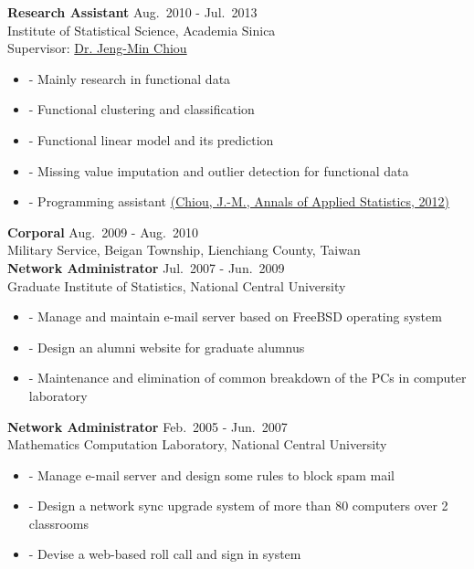\documentclass[a4paper,10pt,dvipdfmx]{article}
\begin{document}
\indent \textbf{Research Assistant} \hfill Aug.~2010 - Jul.~2013\\
\indent Institute of Statistical Science, Academia Sinica\\
\indent Supervisor: \href{http://www.stat.sinica.edu.tw/jmchiou/}{Dr. Jeng-Min Chiou}
\begin{itemize}[noitemsep,nolistsep]
  \item[] - Mainly research in functional data
  \item[] - Functional clustering and classification
  \item[] - Functional linear model and its prediction
  \item[] - Missing value imputation and outlier detection for functional data
  \item[] - Programming assistant \href{https://projecteuclid.org/euclid.aoas/1356629052/}{(Chiou, J.-M., Annals of Applied Statistics, 2012)}\\
\end{itemize}

\indent \textbf{Corporal} \hfill Aug.~2009 - Aug.~2010\\
\indent Military Service, Beigan Township, Lienchiang County, Taiwan\\

\indent \textbf{Network Administrator} \hfill Jul.~2007 - Jun.~2009\\
\indent Graduate Institute of Statistics, National Central University
\begin{itemize}[noitemsep,nolistsep]
  \item[] - Manage and maintain e-mail server based on FreeBSD operating system
  \item[] - Design an alumni website for graduate alumnus
  \item[] - Maintenance and elimination of common breakdown of the PCs in computer laboratory\\
\end{itemize}

\indent \textbf{Network Administrator} \hfill Feb.~2005 - Jun.~2007\\
\indent Mathematics Computation Laboratory, National Central University
\begin{itemize}[noitemsep,nolistsep]
  \item[] - Manage e-mail server and design some rules to block spam mail
  \item[] - Design a network sync upgrade system of more than 80 computers over 2 classrooms
  \item[] - Devise a web-based roll call and sign in system\\
\end{itemize}
\end{document}

